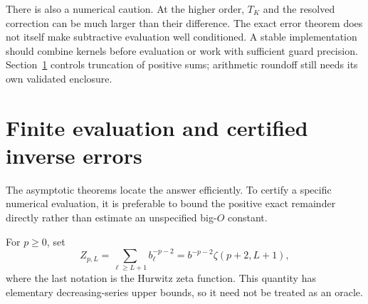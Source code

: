 \documentclass[11pt,a4paper]{article}
\numberwithin{equation}{section}
\theoremstyle{definition}\newtheorem{definition}[theorem]{Definition}
\theoremstyle{remark}\newtheorem{remark}[theorem]{Remark}
\begin{document}
There is also a numerical caution. At the higher order, $T_K$ and the
resolved correction can be much larger than their difference. The exact
error theorem does not itself make subtractive evaluation well conditioned.
A stable implementation should combine kernels before evaluation or work
with sufficient guard precision. Section~\ref{sec:finite} controls
truncation of positive sums; arithmetic roundoff still needs its own
validated enclosure.

\section{Finite evaluation and certified inverse errors}
\label{sec:finite}

The asymptotic theorems locate the answer efficiently. To certify a
specific numerical evaluation, it is preferable to bound the positive
exact remainder directly rather than estimate an unspecified big-$O$
constant.

For $p\ge0$, set
\begin{equation}
 Z_{p,L}=\sum_{\ell\ge L+1}b_\ell^{-p-2}
        =b^{-p-2}\zeta(p+2,L+1),
 \label{eq:Z}
\end{equation}
where the last notation is the Hurwitz zeta function. This quantity has
elementary decreasing-series upper bounds, so it need not be treated as
an oracle.
\end{document}

